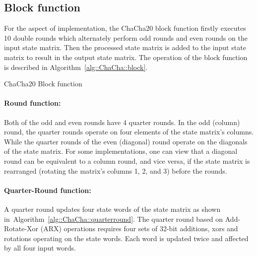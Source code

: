 \subsection{Block function}
For the aspect of implementation, the ChaCha20 block function firstly executes 10 double rounds which alternately perform odd rounds and even rounds on the input state matrix. Then the processed state matrix is added to the input state matrix to result in the output state matrix. The operation of the block function is described in Algorithm~\ref{alg::ChaCha::block}.

\begin{algorithm}
	\BlankLine
	\caption{ChaCha20 Block function}
	\label{alg::ChaCha::block}
\end{algorithm}

\paragraph{Round function:} Both of the odd and even rounds have 4 quarter rounds.
In the odd (column) round, the quarter rounds operate on four elements of the state matrix's columns.
While the quarter rounds of the even (diagonal) round operate on the diagonals of the state matrix.
For some implementations, one can view that a diagonal round can be equivalent to a column round, and vice versa, if the state matrix is rearranged (rotating the matrix's columns 1, 2, and 3) before the rounds. 

\paragraph{Quarter-Round function:} A quarter round updates four state words of the state matrix as shown in~Algorithm~\ref{alg::ChaCha::quarterround}. 
The quarter round based on Add-Rotate-Xor (ARX) operations requires four sets of 32-bit additions, xors and  rotations operating on the state words. 
Each word is updated twice and affected by all four input words.

